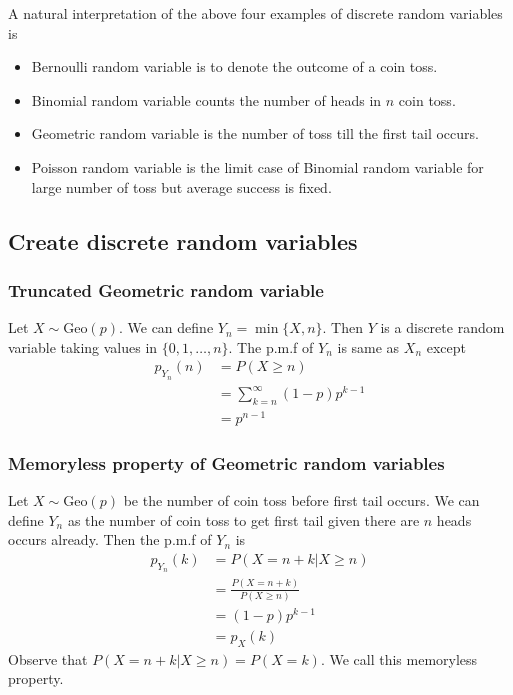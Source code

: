 \begin{remark}
A natural interpretation of the above four examples of discrete random variables is
\begin{itemize}
	\item Bernoulli random variable is to denote the outcome of a coin toss.
	\item Binomial random variable counts the number of heads in $n$ coin toss.
	\item Geometric random variable is the number of toss till the first tail occurs.
	\item Poisson random variable is the limit case of Binomial random variable for large number of toss but average success is fixed.  
\end{itemize}
\end{remark}

\subsection{Create discrete random variables}
\subsubsection{Truncated Geometric random variable}
Let $X \sim \textrm{Geo}(p)$. We can define $Y_n = \min\{X, n\}$. Then $Y$ is a discrete random variable taking values in $\{ 0, 1, \ldots, n\}$. The p.m.f of $Y_n$ is same as $X_n$ except
\begin{align*}
 p_{Y_n}(n) &= P(X\geq n)\\
 &= \sum_{k=n}^\infty (1-p) p^{k-1}\\
 &= p^{n-1}
\end{align*}

\subsubsection{Memoryless property of Geometric random variables}
Let $X \sim \textrm{Geo}(p)$ be the number of coin toss before first tail occurs. We can define $Y_n$ as the number of coin toss to get first tail given there are $n$ heads occurs already. Then the p.m.f of $Y_n$ is
\begin{align*}
	p_{Y_n}(k) &= P(X= n+k | X \geq n)\\
	&= \frac{P(X=n+k)}{P(X\geq n)}\\
	&= (1-p)p^{k-1}\\
	&= p_X(k)
\end{align*}
Observe that $P(X=n+k|X\geq n) = P(X=k) $. We call this memoryless property.


